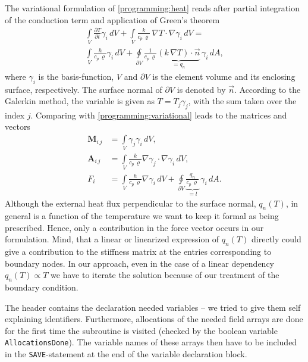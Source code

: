 The variational formulation of \eqref{programming:heat} reads after partial integration of the conduction term and application of Green's theorem
\begin{multline}
\int\limits_{V}\frac{\partial T}{\partial t} \gamma_{i}\,dV + \int\limits_{V}\frac{k}{c_{p}\,\varrho}\, \nabla T \cdot\nabla \gamma_{i}\,dV  =\\ \int\limits_{V} \frac{h}{c_{p}\,\varrho} \gamma_{i}\,dV + \oint\limits_{\partial V}\frac{1}{c_{p}\,\varrho} \underbrace{(k\,\nabla T)\cdot\vec{n}}_{=q_{n}}\,\gamma_{i}\,dA,
\end{multline}
where $\gamma_{i}$ is the basis-function, $V$ and $\partial V$ is the element volume and its enclosing surface, respectively.
The surface normal of $\partial V$ is denoted by $\vec{n}$. According to the Galerkin method, the variable is given as $T = T_{j} \gamma_{j}$, with the sum taken over the index $j$. Comparing with \eqref{programming:variational} leads to the matrices and vectors
\begin{equation}\label{programming:matrices}
\begin{split}
 \mathbf{M}_{i\,j} &= \int\limits_{V} \gamma_{j}\gamma_{i}\,dV,\\
 \mathbf{A}_{i\,j} &= \int\limits_{V} \frac{k}{c_{p}\,\varrho} \nabla \gamma_{j}\cdot\nabla \gamma_{i}\,dV,\\
         F_{i}         &= \int\limits_{V}\frac{h}{c_{p}\,\varrho}\nabla \gamma_{i}\,dV + \oint\limits_{\partial V}\underbrace{\frac{q_{n}}{c_{p}\,\varrho}}_{= l} \,\gamma_{i}\,dA.
\end{split}
\end{equation}
Although the external heat flux perpendicular to the surface normal, $q_{n}(T)$, in general is a function of the temperature we want to keep it formal as being prescribed. Hence, only a contribution in the force vector occurs in our formulation. Mind, that a linear or linearized expression of $q_{n}(T)$ directly could give a contribution to the stiffness matrix at the entries corresponding to boundary nodes. In our approach, even in the case of a linear dependency $q_{n}(T) \propto T$ we have to iterate the solution because of our treatment of the boundary condition.

The header contains the declaration needed variables -- we tried to give them self explaining identifiers. Furthermore, allocations of the needed field arrays are done for the first time the subroutine is visited (checked by the boolean variable \texttt{AllocationsDone}). The variable names of these arrays then have to be included in the \texttt{SAVE}-statement at the end of the variable declaration block.

